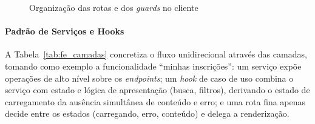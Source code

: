 \begin{figure}[H]
\centering
\setlength{\fboxsep}{8pt}
\caption{Organização das rotas e dos \textit{guards} no cliente}
\label{fig:fe_rotas_guards}
\end{figure}

\paragraph{Padrão de Serviços e Hooks}

A Tabela~\ref{tab:fe_camadas} concretiza o fluxo unidirecional através das camadas, tomando como exemplo a funcionalidade ``minhas inscrições'': um serviço expõe operações de alto nível sobre os \textit{endpoints}; um \textit{hook} de caso de uso combina o serviço com estado e lógica de apresentação (busca, filtros), derivando o estado de carregamento da ausência simultânea de conteúdo e erro; e uma rota fina apenas decide entre os estados (carregando, erro, conteúdo) e delega a renderização.


